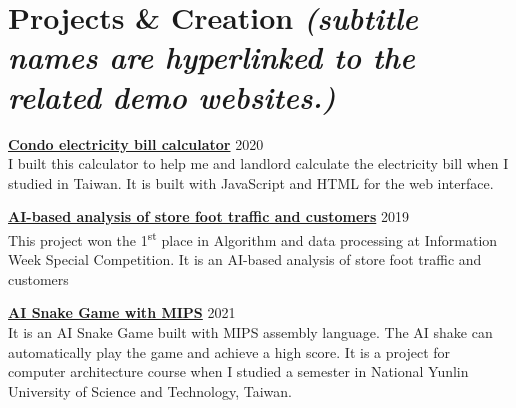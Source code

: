 \newpage
\section{Projects \& Creation \small\textit{(subtitle names are hyperlinked to the related demo websites.)}}
\begin{entrylist}
    \item \href{https://freecodeinfosite.blogspot.com/2020/02/blog-post.html}{\textbf{Condo electricity bill calculator}} \hfill 2020\\
    I built this calculator to help me and landlord calculate the electricity bill when I studied in Taiwan. It is built with JavaScript and HTML for the web interface.
    \item \href{https://www.youtube.com/watch?v=D4eXmWE0Ixo}{\textbf{AI-based analysis of store foot traffic and customers}} \hfill 2019\\
    This project won the 1\textsuperscript{st} place in Algorithm and data processing at Information Week Special Competition. It is an AI-based analysis of store foot traffic and customers
    \item \href{https://www.youtube.com/watch?v=1JVbP61-KmU}{\textbf{AI Snake Game with MIPS}} \hfill 2021\\
    It is an AI Snake Game built with MIPS assembly language. The AI shake can automatically play the game and achieve a high score. It is a project for computer architecture course when I studied a semester in National Yunlin University of Science and Technology, Taiwan.
\end{entrylist}

